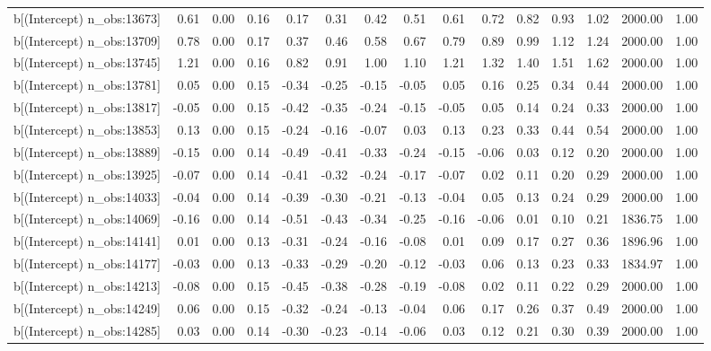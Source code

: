 \begin{table}[ht]
\begin{tabular}{rrrrrrrrrrrrrrr}
  b[(Intercept) n\_obs:13673] & 0.61 & 0.00 & 0.16 & 0.17 & 0.31 & 0.42 & 0.51 & 0.61 & 0.72 & 0.82 & 0.93 & 1.02 & 2000.00 & 1.00 \\ 
  b[(Intercept) n\_obs:13709] & 0.78 & 0.00 & 0.17 & 0.37 & 0.46 & 0.58 & 0.67 & 0.79 & 0.89 & 0.99 & 1.12 & 1.24 & 2000.00 & 1.00 \\ 
  b[(Intercept) n\_obs:13745] & 1.21 & 0.00 & 0.16 & 0.82 & 0.91 & 1.00 & 1.10 & 1.21 & 1.32 & 1.40 & 1.51 & 1.62 & 2000.00 & 1.00 \\ 
  b[(Intercept) n\_obs:13781] & 0.05 & 0.00 & 0.15 & -0.34 & -0.25 & -0.15 & -0.05 & 0.05 & 0.16 & 0.25 & 0.34 & 0.44 & 2000.00 & 1.00 \\ 
  b[(Intercept) n\_obs:13817] & -0.05 & 0.00 & 0.15 & -0.42 & -0.35 & -0.24 & -0.15 & -0.05 & 0.05 & 0.14 & 0.24 & 0.33 & 2000.00 & 1.00 \\ 
  b[(Intercept) n\_obs:13853] & 0.13 & 0.00 & 0.15 & -0.24 & -0.16 & -0.07 & 0.03 & 0.13 & 0.23 & 0.33 & 0.44 & 0.54 & 2000.00 & 1.00 \\ 
  b[(Intercept) n\_obs:13889] & -0.15 & 0.00 & 0.14 & -0.49 & -0.41 & -0.33 & -0.24 & -0.15 & -0.06 & 0.03 & 0.12 & 0.20 & 2000.00 & 1.00 \\ 
  b[(Intercept) n\_obs:13925] & -0.07 & 0.00 & 0.14 & -0.41 & -0.32 & -0.24 & -0.17 & -0.07 & 0.02 & 0.11 & 0.20 & 0.29 & 2000.00 & 1.00 \\ 
  b[(Intercept) n\_obs:14033] & -0.04 & 0.00 & 0.14 & -0.39 & -0.30 & -0.21 & -0.13 & -0.04 & 0.05 & 0.13 & 0.24 & 0.29 & 2000.00 & 1.00 \\ 
  b[(Intercept) n\_obs:14069] & -0.16 & 0.00 & 0.14 & -0.51 & -0.43 & -0.34 & -0.25 & -0.16 & -0.06 & 0.01 & 0.10 & 0.21 & 1836.75 & 1.00 \\ 
  b[(Intercept) n\_obs:14141] & 0.01 & 0.00 & 0.13 & -0.31 & -0.24 & -0.16 & -0.08 & 0.01 & 0.09 & 0.17 & 0.27 & 0.36 & 1896.96 & 1.00 \\ 
  b[(Intercept) n\_obs:14177] & -0.03 & 0.00 & 0.13 & -0.33 & -0.29 & -0.20 & -0.12 & -0.03 & 0.06 & 0.13 & 0.23 & 0.33 & 1834.97 & 1.00 \\ 
  b[(Intercept) n\_obs:14213] & -0.08 & 0.00 & 0.15 & -0.45 & -0.38 & -0.28 & -0.19 & -0.08 & 0.02 & 0.11 & 0.22 & 0.29 & 2000.00 & 1.00 \\ 
  b[(Intercept) n\_obs:14249] & 0.06 & 0.00 & 0.15 & -0.32 & -0.24 & -0.13 & -0.04 & 0.06 & 0.17 & 0.26 & 0.37 & 0.49 & 2000.00 & 1.00 \\ 
  b[(Intercept) n\_obs:14285] & 0.03 & 0.00 & 0.14 & -0.30 & -0.23 & -0.14 & -0.06 & 0.03 & 0.12 & 0.21 & 0.30 & 0.39 & 2000.00 & 1.00 \\ 

\end{tabular}
\end{table}
